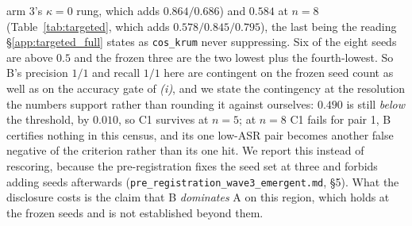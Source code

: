\documentclass{article}
\begin{document}
arm 3's $\kappa{=}0$ rung, which adds $0.864/0.686$) and $0.584$ at $n{=}8$
(Table~\ref{tab:targeted}, which adds $0.578/0.845/0.795$), the last being the reading
§\ref{app:targeted_full} states as \texttt{cos\_krum} never suppressing. Six of the eight seeds are
above $0.5$ and the frozen three are the two lowest plus the fourth-lowest. So B's precision $1/1$
and recall $1/1$ here are contingent on the frozen seed count as well as on the accuracy gate of
\emph{(i)}, and we state the contingency at the resolution the numbers support rather than rounding
it against ourselves: $0.490$ is still \emph{below} the threshold, by $0.010$, so C1 survives at
$n{=}5$; at $n{=}8$ C1 fails for pair 1, B certifies nothing in this census, and its one low-ASR
pair becomes another false negative of the criterion rather than its one hit. We report this instead of rescoring,
because the pre-registration fixes the seed set at three and forbids adding seeds afterwards
(\texttt{pre\_registration\_wave3\_emergent.md}, §5). What the disclosure costs is the claim that B
\emph{dominates} A on this region, which holds at the frozen seeds and is not established beyond them.

\end{document}
